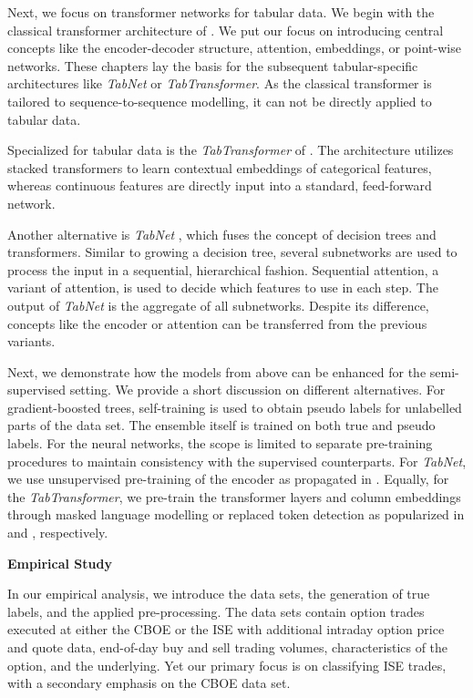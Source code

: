 Next, we focus on transformer networks for tabular data. We begin with the classical transformer architecture of \textcite{vaswaniAttentionAllYou2017}. We put our focus on introducing central concepts like the encoder-decoder structure, attention, embeddings, or point-wise networks. These chapters lay the basis for the subsequent tabular-specific architectures like \textit{TabNet} or \textit{TabTransformer}. As the classical transformer is tailored to sequence-to-sequence modelling, it can not be directly applied to tabular data.

Specialized for tabular data is the \textit{TabTransformer} of \textcite{huangTabTransformerTabularData2020}. The architecture utilizes stacked transformers to learn contextual embeddings of categorical features, whereas continuous features are directly input into a standard, feed-forward network.

Another alternative is \textit{TabNet} \autocite{arikTabNetAttentiveInterpretable2020}, which fuses the concept of decision trees and transformers. Similar to growing a decision tree, several subnetworks are used to process the input in a sequential, hierarchical fashion. Sequential attention, a variant of attention, is used to decide which features to use in each step. The output of \textit{TabNet} is the aggregate of all subnetworks. Despite its difference, concepts like the encoder or attention can be transferred from the previous variants. 

Next, we demonstrate how the models from above can be enhanced for the semi-supervised setting. We provide a short discussion on different alternatives. For gradient-boosted trees, self-training \autocite{yarowskyUnsupervisedWordSense1995} is used to obtain pseudo labels for unlabelled parts of the data set. The ensemble itself is trained on both true and pseudo labels. For the neural networks, the scope is limited to separate pre-training procedures to maintain consistency with the supervised counterparts. For \textit{TabNet}, we use unsupervised pre-training of the encoder as propagated in \textcite{arikTabNetAttentiveInterpretable2020}. Equally, for the \textit{TabTransformer}, we pre-train the transformer layers and column embeddings through masked language modelling or replaced token detection as popularized in \textcite{devlinBERTPretrainingDeep2019} and \textcite{clarkELECTRAPretrainingText2020}, respectively. 

\textbf{Empirical Study}

In our empirical analysis, we introduce the data sets, the generation of true labels, and the applied pre-processing. The data sets contain option trades executed at either the \gls{CBOE} or the \gls{ISE} with additional intraday option price and quote data, end-of-day buy and sell trading volumes, characteristics of the option, and the underlying. Yet our primary focus is on classifying \gls{ISE} trades, with a secondary emphasis on the \gls{CBOE} data set. 

